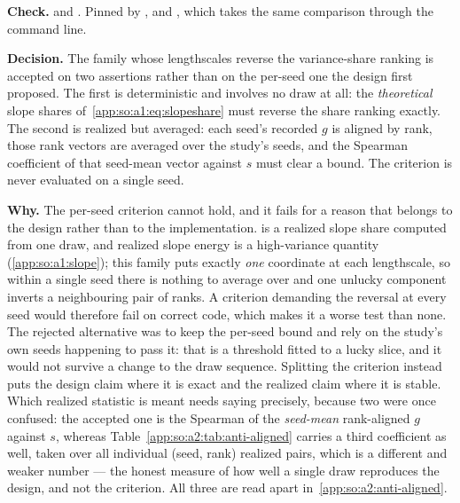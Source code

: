 \begin{sloppypar}
\textbf{Check.}  and
. Pinned by
,
and , which takes the
same comparison through the command line.
\end{sloppypar}

\label{app:so:a4:r13}

\textbf{Decision.} The family whose lengthscales reverse the variance-share
ranking is accepted on two assertions rather than on the per-seed one the
design first proposed. The first is deterministic and involves no draw at all:
the \emph{theoretical} slope shares of~\eqref{app:so:a1:eq:slopeshare} must
reverse the share ranking exactly. The second is realized but averaged: each
seed's recorded $g$ is aligned by rank, those rank vectors are averaged over
the study's seeds, and the Spearman coefficient of that seed-mean vector
against $s$ must clear a bound. The criterion is never evaluated on a single
seed.

\textbf{Why.} The per-seed criterion cannot hold, and it fails for a reason
that belongs to the design rather than to the implementation.
 is a realized slope share computed from one draw, and
realized slope energy is a high-variance quantity (\ref{app:so:a1:slope}); this
family puts exactly \emph{one} coordinate at each lengthscale, so within a
single seed there is nothing to average over and one unlucky component inverts
a neighbouring pair of ranks. A criterion demanding the reversal at every seed
would therefore fail on correct code, which makes it a worse test than none.
The rejected alternative was to keep the per-seed bound and rely on the study's
own seeds happening to pass it: that is a threshold fitted to a lucky slice,
and it would not survive a change to the draw sequence. Splitting the criterion
instead puts the design claim where it is exact and the realized claim where it
is stable. Which realized statistic is meant needs saying precisely, because
two were once confused: the accepted one is the Spearman of the
\emph{seed-mean} rank-aligned $g$ against $s$, whereas
Table~\ref{app:so:a2:tab:anti-aligned} carries a third coefficient as well,
taken over all individual (seed, rank) realized pairs, which is a different and
weaker number --- the honest measure of how well a single draw reproduces the
design, and not the criterion. All three are read apart
in~\ref{app:so:a2:anti-aligned}.

